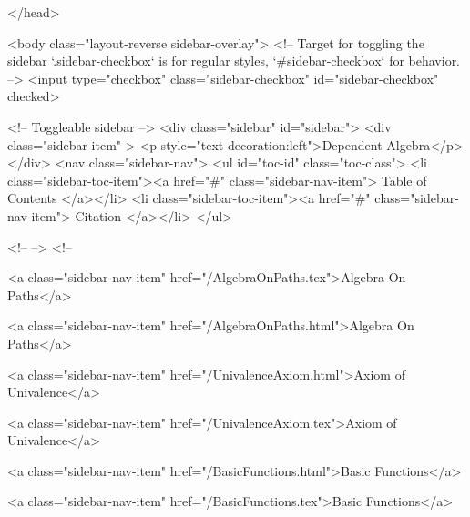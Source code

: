   
</head>




  <body class="layout-reverse sidebar-overlay">
    <!-- Target for toggling the sidebar `.sidebar-checkbox` is for regular
     styles, `#sidebar-checkbox` for behavior. -->
<input type="checkbox" class="sidebar-checkbox" id="sidebar-checkbox" checked>

<!-- Toggleable sidebar -->
<div class="sidebar" id="sidebar">
  <div class="sidebar-item" >
    <p style="text-decoration:left">Dependent Algebra</p>
  </div>
  <nav class="sidebar-nav">
    <ul id="toc-id" class="toc-class">
  <li class="sidebar-toc-item"><a href="#" class="sidebar-nav-item"> Table of Contents </a></li>
  <li class="sidebar-toc-item"><a href="#" class="sidebar-nav-item"> Citation </a></li>
</ul>


    <!--  -->
    <!-- 
      
    
      
    
      
    
      
        
      
    
      
        
          <a class="sidebar-nav-item" href="/AlgebraOnPaths.tex">Algebra On Paths</a>
        
      
    
      
        
          <a class="sidebar-nav-item" href="/AlgebraOnPaths.html">Algebra On Paths</a>
        
      
    
      
        
          <a class="sidebar-nav-item" href="/UnivalenceAxiom.html">Axiom of Univalence</a>
        
      
    
      
        
          <a class="sidebar-nav-item" href="/UnivalenceAxiom.tex">Axiom of Univalence</a>
        
      
    
      
        
          <a class="sidebar-nav-item" href="/BasicFunctions.html">Basic Functions</a>
        
      
    
      
        
          <a class="sidebar-nav-item" href="/BasicFunctions.tex">Basic Functions</a>
        
      
    
